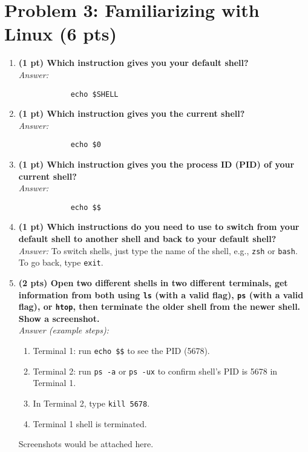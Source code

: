 \documentclass[12pt]{article}
\begin{document}
	\section{Problem 3: Familiarizing with Linux (6 pts)}
	\begin{enumerate}
		\item \textbf{(1 pt) Which instruction gives you your default shell?} \\
		\textit{Answer:}
		\begin{lstlisting}
			echo $SHELL
		\end{lstlisting}
		
		\item \textbf{(1 pt) Which instruction gives you the current shell?} \\
		\textit{Answer:}
		\begin{lstlisting}
			echo $0
		\end{lstlisting}
		\item \textbf{(1 pt) Which instruction gives you the process ID (PID) of your current shell?} \\
		\textit{Answer:}
		\begin{lstlisting}
			echo $$
		\end{lstlisting}
		
		\item \textbf{(1 pt) Which instructions do you need to use to switch from your default shell to another shell and back to your default shell?}\\
		\textit{Answer:} To switch shells, just type the name of the shell, e.g., \texttt{zsh} or \texttt{bash}. To go back, type \texttt{exit}.
		
		\item \textbf{(2 pts) Open two different shells in two different terminals, get information from both using \texttt{ls} (with a valid flag), \texttt{ps} (with a valid flag), or \texttt{htop}, then terminate the older shell from the newer shell. Show a screenshot.}\\
		\textit{Answer (example steps):}
		\begin{enumerate}
			\item Terminal 1: run \texttt{echo \$\$} to see the PID (5678).
			\item Terminal 2: run \texttt{ps -a} or \texttt{ps -ux} to confirm shell’s PID is 5678 in Terminal 1.
			\item In Terminal 2, type \texttt{kill 5678}.
			\item Terminal 1 shell is terminated.
		\end{enumerate}
		Screenshots would be attached here.
	\end{enumerate}
	
\end{document}
